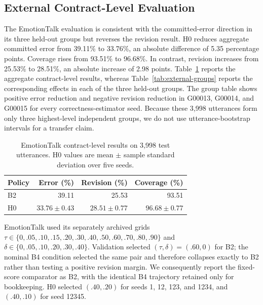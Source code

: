 \documentclass[journal]{IEEEtran}
\begin{document}




\subsection{External Contract-Level Evaluation}

The EmotionTalk evaluation is consistent with the committed-error direction in its three held-out groups but reverses the revision result. H0 reduces aggregate committed error from 39.11\% to 33.76\%, an absolute difference of 5.35 percentage points. Coverage rises from 93.51\% to 96.68\%. In contrast, revision increases from 25.53\% to 28.51\%, an absolute increase of 2.98 points. Table~\ref{tab:external} reports the aggregate contract-level results, whereas Table~\ref{tab:external-groups} reports the corresponding effects in each of the three held-out groups. The group table shows positive error reduction and negative revision reduction in G00013, G00014, and G00015 for every correctness-estimator seed. Because these 3,998 utterances form only three highest-level independent groups, we do not use utterance-bootstrap intervals for a transfer claim.

\begin{table}[t]
\centering
\caption{EmotionTalk contract-level results on 3,998 test utterances. H0 values are mean $\pm$ sample standard deviation over five seeds.}
\label{tab:external}
\begin{tabular}{lrrr}
\toprule
Policy & Error (\%) & Revision (\%) & Coverage (\%) \\
\midrule
B2 & 39.11 & 25.53 & 93.51 \\
H0 & $33.76\pm0.43$ & $28.51\pm0.77$ & $96.68\pm0.77$ \\
\bottomrule
\end{tabular}
\end{table}

EmotionTalk used its separately archived grids $\tau\in\{0,.05,.10,.15,.20,.30,.40,.50,.60,.70,.80,.90\}$ and $\delta\in\{0,.05,.10,.20,.30,.40\}$. Validation selected $(\tau,\delta)=(.60,0)$ for B2; the nominal B4 condition selected the same pair and therefore collapses exactly to B2 rather than testing a positive revision margin. We consequently report the fixed-score comparator as B2, with the identical B4 trajectory retained only for bookkeeping. H0 selected $(.40,.20)$ for seeds 1, 12, 123, and 1234, and $(.40,.10)$ for seed 12345.
\end{document}

